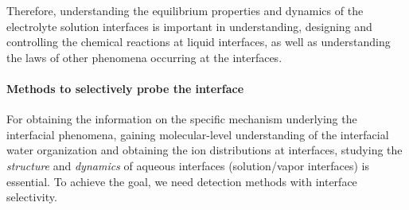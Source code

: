 Therefore, understanding the equilibrium properties and dynamics of the electrolyte solution interfaces 
is important in understanding, designing and controlling the chemical reactions at liquid interfaces\cite{Chang06}, 
as well as understanding the laws of other phenomena occurring at the interfaces. 

\paragraph{Methods to selectively probe the interface}
For obtaining the information on the specific mechanism underlying the interfacial phenomena,
gaining molecular-level understanding of the interfacial water organization and obtaining the ion distributions at interfaces,
studying the \emph{structure} and \emph{dynamics} of aqueous interfaces (solution/vapor interfaces) is essential.
To achieve the goal, we need detection methods with interface selectivity. 

